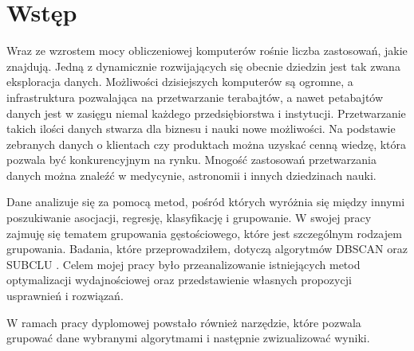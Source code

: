 \chapter{Wstęp}
Wraz ze wzrostem mocy obliczeniowej komputerów rośnie liczba zastosowań, jakie znajdują. Jedną z dynamicznie rozwijających się obecnie dziedzin jest tak zwana eksploracja danych. Możliwości dzisiejszych komputerów są ogromne, a infrastruktura pozwalająca na przetwarzanie terabajtów, a nawet petabajtów danych jest w zasięgu niemal każdego przedsiębiorstwa i instytucji. Przetwarzanie takich ilości danych stwarza dla biznesu i nauki nowe możliwości. Na podstawie zebranych danych o klientach czy produktach można uzyskać cenną wiedzę, która pozwala być konkurencyjnym na rynku. Mnogość zastosowań przetwarzania danych można znaleźć w medycynie, astronomii i innych dziedzinach nauki. \par
Dane analizuje się za pomocą metod, pośród których wyróżnia się między innymi poszukiwanie asocjacji, regresję, klasyfikację i grupowanie. W swojej pracy zajmuję się tematem grupowania gęstościowego, które jest szczególnym rodzajem grupowania. Badania, które przeprowadziłem, dotyczą algorytmów DBSCAN \cite{dbscan} oraz SUBCLU \cite{subclu}. Celem mojej pracy było przeanalizowanie istniejących metod optymalizacji wydajnościowej oraz przedstawienie własnych propozycji usprawnień i rozwiązań. \par
W ramach pracy dyplomowej powstało również narzędzie, które pozwala grupować dane wybranymi algorytmami i następnie zwizualizować wyniki. 
